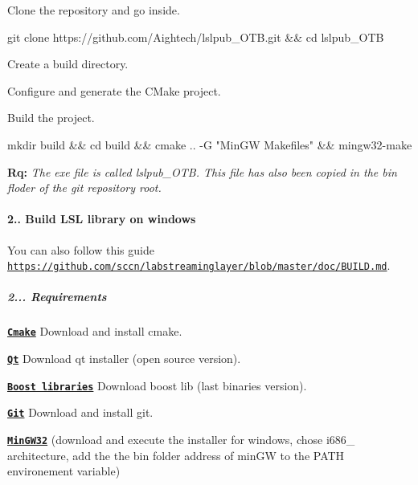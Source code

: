 \begin{DoxyItemize}
\item Clone the repository and go inside. 
\begin{DoxyCode}
git clone https://github.com/Aightech/lslpub\_OTB.git && cd lslpub\_OTB
\end{DoxyCode}

\item Create a build directory.
\item Configure and generate the C\+Make project.
\item Build the project. 
\begin{DoxyCode}
mkdir build && cd build && cmake .. -G "MinGW Makefiles" && mingw32-make
\end{DoxyCode}
 {\bfseries Rq\+:} {\itshape The exe file is called lslpub\+\_\+\+O\+TB. This file has also been copied in the bin floder of the git repository root.}
\end{DoxyItemize}

\paragraph*{2.. Build L\+SL library on windows}

You can also follow this guide \href{https://github.com/sccn/labstreaminglayer/blob/master/doc/BUILD.md}{\tt https\+://github.\+com/sccn/labstreaminglayer/blob/master/doc/\+B\+U\+I\+L\+D.\+md}. \subparagraph*{2... {\bfseries Requirements}}


\begin{DoxyItemize}
\item \href{https://cmake.org/download/}{\tt {\bfseries Cmake}} Download and install cmake.
\item \href{https://www.qt.io/download}{\tt {\bfseries Qt}} Download qt installer (open source version).
\item \href{https://sourceforge.net/projects/boost/files/boost-binaries/}{\tt {\bfseries Boost libraries}} Download boost lib (last binaries version).
\item \href{https://git-for-windows.github.io/}{\tt {\bfseries Git}} Download and install git.
\item \href{https://sourceforge.net/projects/mingw-w64/}{\tt {\bfseries Min\+G\+W32}} (download and execute the installer for windows, chose i686\+\_ architecture, add the the bin folder address of min\+GW to the P\+A\+TH environement variable)
\end{DoxyItemize}

